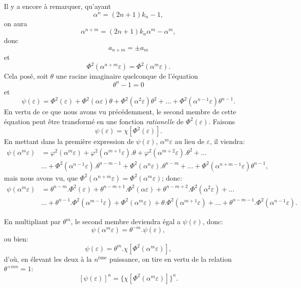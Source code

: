 \documentclass{article}
\begin{document}
Il y a encore à remarquer, qu'ayant
\[ \alpha^{n}=(2n+1)k_{n}-1, \]
on aura
\[ \alpha^{n+m}=(2n+1)k_{n}\alpha^{m}-\alpha^{m}, \]
donc
\[ a_{n+m}=\pm a_{m} \]
et
\[ \Phi^{2}(\alpha^{n+m}\varepsilon)=\Phi^{2}(\alpha^{m}\varepsilon). \]
Cela posé, soit $\theta$ une racine imaginaire quelconque de l'équation
\[ \theta^{n}-1=0 \]
et
\[ \psi(\varepsilon)=\Phi^{2}(\varepsilon)+\Phi^{2}(\alpha\varepsilon)\theta+\Phi^{2}(\alpha^{2}\varepsilon)\theta^{2}+\ldots+\Phi^{2}(\alpha^{n-1}\varepsilon)\theta^{n-1}. \tag{108.} \]
En vertu de ce que nous avons vu précédemment, le second membre de cette équation peut être transformé en une fonction \emph{rationelle} de $\Phi^{2}(\varepsilon)$. Faisons
\[ \psi(\varepsilon)=\chi[\Phi^{2}(\varepsilon)]. \tag{109.} \]
En mettant dans la première expression de $\psi(\varepsilon)$, $\alpha^{m}\varepsilon$ au lieu de $\varepsilon$, il viendra:
\[ \begin{aligned}
\psi(\alpha^{m}\varepsilon)&=\varphi^{2}(\alpha^{m}\varepsilon)+\varphi^{2}(\alpha^{m+1}\varepsilon).\theta+\varphi^{2}(\alpha^{m+2}\varepsilon).\theta^{2}+\ldots\\
&\ldots+\Phi^{2}(\alpha^{n-1}\varepsilon).\theta^{n-m-1}+\Phi^{2}(\alpha^{n}\varepsilon).\theta^{n-m}+\ldots+\Phi^{2}(\alpha^{n+m-1}\varepsilon)\theta^{n-1},
\end{aligned} \]
mais nous avons vu, que $\Phi^{2}(\alpha^{n+m}\varepsilon)=\Phi^{2}(\alpha^{m}\varepsilon)$; donc:
\[ \begin{aligned}
\psi(\alpha^{m}\varepsilon)&=\theta^{n-m}.\Phi^{2}(\varepsilon)+\theta^{n-m+1}.\Phi^{2}(\alpha\varepsilon)+\theta^{n-m+2}.\Phi^{2}(\alpha^{2}\varepsilon)+\ldots\\
&\ldots+\theta^{n-1}.\Phi^{2}(\alpha^{m-1}\varepsilon)+\Phi^{2}(\alpha^{m}\varepsilon)+\theta.\Phi^{2}(\alpha^{m+1}\varepsilon)+\ldots+\theta^{n-m-1}.\Phi^{2}(\alpha^{n-1}\varepsilon).
\end{aligned} \]

En multipliant par $\theta^{m}$, le second membre deviendra égal a $\psi(\varepsilon)$, donc:
\[ \psi(\alpha^{m}\varepsilon)=\theta^{-m}.\psi(\varepsilon), \tag{110.} \]
ou bien:
\[ \psi(\varepsilon)=\theta^{m}.\chi[\Phi^{2}(\alpha^{m}\varepsilon)], \]
d'où, en élevant les deux à la $n^{\text{ème}}$ puissance, on tire en vertu de la relation $\theta^{+mn}=1$:
\[ [\psi(\varepsilon)]^{n}=\{\chi[\Phi^{2}(\alpha^{m}\varepsilon)]\}^{n}. \tag{111.} \]
\end{document}
